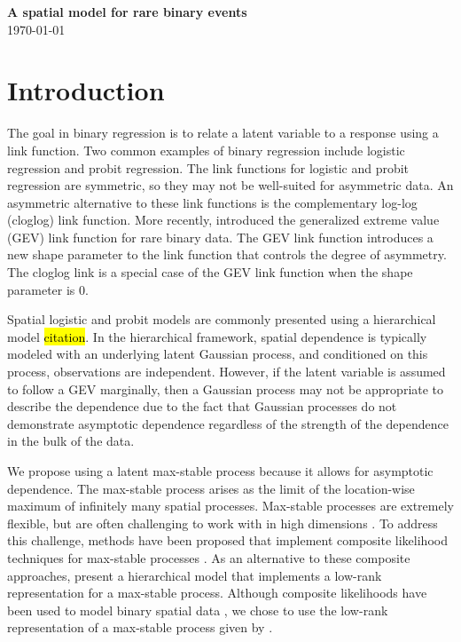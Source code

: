 \documentclass[11pt]{article}
\begin{document}
\linenumbers

\begin{center}
{\Large {\bf A spatial model for rare binary events}}\\
\today
\end{center}

\section{Introduction}\label{s:intro}

The goal in binary regression is to relate a latent variable to a response using a link function.
Two common examples of binary regression include logistic regression
and probit regression.
The link functions for logistic and probit regression are symmetric, so they may not be well-suited for asymmetric data.
An asymmetric alternative to these link functions is the complementary log-log (cloglog) link function.
More recently, \citet{Wang2010} introduced the generalized extreme value (GEV) link function for rare binary data.
The GEV link function introduces a new shape parameter to the link function that controls the degree of asymmetry.
The cloglog link is a special case of the GEV link function when the shape parameter is 0.

Spatial logistic and probit models are commonly presented using a hierarchical model \hl{citation}.
In the hierarchical framework, spatial dependence is typically modeled with an underlying latent Gaussian process, and conditioned on this process, observations are independent.
However, if the latent variable is assumed to follow a GEV marginally, then a Gaussian process may not be appropriate to describe the dependence due to the fact that Gaussian processes do not demonstrate asymptotic dependence regardless of the strength of the dependence in the bulk of the data.

We propose using a latent max-stable process \citep{deHaan1984} because it allows for asymptotic dependence.
The max-stable process arises as the limit of the location-wise maximum of infinitely many spatial processes.
Max-stable processes are extremely flexible, but are often challenging to work with in high dimensions \citep{Wadsworth2014,Thibaud2013a}.
To address this challenge, methods have been proposed that implement composite likelihood techniques for max-stable processes \citep{Padoan2010,Genton2011,Huser2014}.
As an alternative to these composite approaches, \citet{Reich2012} present a hierarchical model that implements a low-rank representation for a max-stable process.
Although composite likelihoods have been used to model binary spatial data \citep{Heagerty1998}, we chose to use the low-rank representation of a max-stable process given by \citet{Reich2012}.
\end{document}
